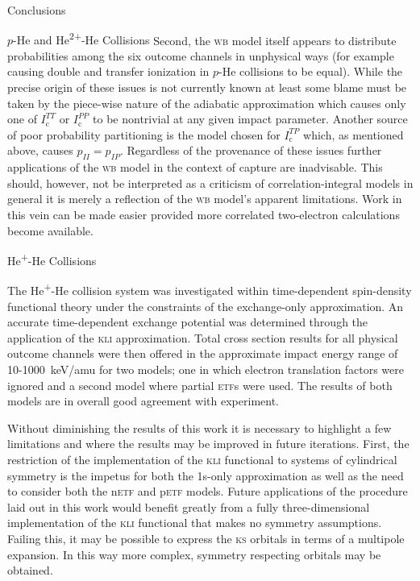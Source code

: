 \documentclass[letterpaper, 11 pt]{report}
\begin{document}
\begin{chapter}{Conclusions \label{chap:con}}
\begin{section}{\texorpdfstring{$p$}{p}-He and \texorpdfstring{He\textsuperscript{2+}}{He2+}-He
                   Collisions \label{sec:con-phe2p-he}}
      Second, the \textsc{wb} model itself appears to distribute probabilities among the six outcome
      channels in unphysical ways (for example causing double and transfer ionization in $p$-He
      collisions to be equal). While the precise origin of these issues is not currently known at least
      some blame must be taken by the piece-wise nature of the adiabatic approximation which causes only
      one of $I^{TT}_\mathrm{c}$ or $I^{PP}_\mathrm{c}$ to be nontrivial at any given impact parameter.
      Another source of poor probability partitioning is the model chosen for $I^{TP}_\mathrm{c}$ which,
      as mentioned above, causes $p_{II} = p_{IP}$. Regardless of the provenance of these issues further
      applications of the \textsc{wb} model in the context of capture are inadvisable. This should,
      however, not be interpreted as a criticism of correlation-integral models in general it is merely
      a reflection of the \textsc{wb} model's apparent limitations. Work in this vein can be made easier
      provided more correlated two-electron calculations become available.

   \end{section}

   \begin{section}{\texorpdfstring{He\textsuperscript{+}}{He+}-He Collisions \label{sec:con-hephe}}

      The He\textsuperscript{+}-He collision system was investigated within  time-dependent spin-density
      functional theory under the constraints of the exchange-only approximation. An accurate
      time-dependent exchange potential was determined through the application of the \textsc{kli}
      approximation. Total cross section results for all physical outcome channels were then offered in
      the approximate impact energy range of 10-1000~keV/amu for two models; one in which electron
      translation factors were ignored and a second model where partial \textsc{etf}s
      were used. The results of both models are in overall good agreement with experiment.

      Without diminishing the results of this work it is necessary to highlight a few limitations and
      where the results may be improved in future iterations. First, the restriction of the
      implementation of the \textsc{kli} functional to systems of cylindrical symmetry is the impetus
      for both the 1s-only approximation as well as the need to consider both the n\textsc{etf} and
      p\textsc{etf} models. Future applications of the procedure laid out in this work would benefit
      greatly from a fully three-dimensional implementation of the \textsc{kli} functional that makes no
      symmetry assumptions. Failing this, it may be possible to express the \textsc{ks} orbitals in
      terms of a multipole expansion. In this way more complex, symmetry respecting orbitals may be
      obtained.


\end{section}
\end{chapter}
\end{document}
